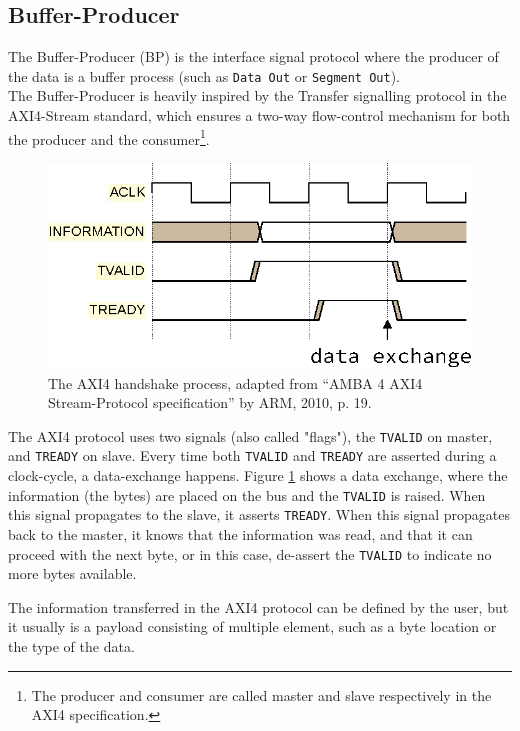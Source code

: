 \subsection{Buffer-Producer}
The Buffer-Producer (BP) is the interface signal protocol where the producer of
the data is a buffer process (such as \texttt{Data Out} or \texttt{Segment
Out}).\\
The Buffer-Producer is heavily inspired by the Transfer signalling protocol in
the AXI4-Stream standard, which ensures a two-way flow-control mechanism for both
the producer and the consumer\footnote{The producer and consumer are called
master and slave respectively in the AXI4 specification.}\cite{arm_axi4}.

\begin{figure}[h]
\centering
\includegraphics[scale=0.8]{implementation/axi4_handshake.eps}
\caption{The AXI4 handshake process, adapted from “AMBA 4 AXI4 Stream-Protocol
specification” by ARM, 2010, p. 19.}
\label{fig:axi4_handshake}
\end{figure}

The AXI4 protocol uses two signals (also called "flags"), the \texttt{TVALID}
on master, and \texttt{TREADY} on slave. Every time both \texttt{TVALID} and
\texttt{TREADY} are asserted during a clock-cycle, a data-exchange happens.
Figure \ref{fig:axi4_handshake} shows a data exchange, where the information
(the bytes) are placed on the bus and the \texttt{TVALID} is raised. When this
signal propagates to the slave, it asserts \texttt{TREADY}. When this signal
propagates back to the master, it knows that the information was read, and that
it can proceed with the next byte, or in this case, de-assert the
\texttt{TVALID} to indicate no more bytes available\cite{arm_axi4}.

The information transferred in the AXI4 protocol can be defined by the user,
but it usually is a payload consisting of multiple element, such as a byte
location or the type of the data.\\

